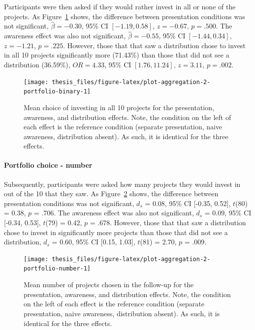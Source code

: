 \documentclass[a4paper, nobind, dvipsnames]{templates/ociamthesis}
\theoremstyle{definition}
\theoremstyle{definition}
\theoremstyle{definition}
\theoremstyle{definition}
\theoremstyle{remark}
\begin{document}
Participants were then asked if they would rather invest in all or none of the
projects. As Figure~\ref{fig:plot-aggregation-2-portfolio-binary} shows, the
difference between presentation conditions was not significant,
\(\hat{\beta} = -0.30\), 95\% CI \([-1.19, 0.58]\), \(z = -0.67\), \(p = .500\). The
awareness effect was also not significant,
\(\hat{\beta} = -0.55\), 95\% CI \([-1.44, 0.34]\), \(z = -1.21\), \(p = .225\). However,
those that that saw a distribution chose to invest in all 10 projects
significantly more
(71.43\%) than
those that did not see a distribution
(36.59\%),
\(OR = 4.33\), 95\% CI \([1.76, 11.24]\), \(z = 3.11\), \(p = .002\).



\begin{figure}
\texttt{[image: thesis\_files/figure-latex/plot-aggregation-2-portfolio-binary-1]} \caption{Mean choice of investing in all 10 projects for the presentation, awareness, and distribution effects. Note, the condition on the left of each effect is the reference condition (separate presentation, naive awareness, distribution absent). As such, it is identical for the three effects.}\label{fig:plot-aggregation-2-portfolio-binary}
\end{figure}

\paragraph{Portfolio choice - number}

Subsequently, participants were asked how many projects they would invest in out
of the 10 that they saw. As
Figure~\ref{fig:plot-aggregation-2-portfolio-number} shows, the difference
between presentation conditions was not significant,
\(d_s\) = 0.08, 95\% CI {[}-0.35, 0.52{]}, \(t\)(80) = 0.38, \(p\) = .706. The awareness effect
was also not significant, \(d_s\) = 0.09, 95\% CI {[}-0.34, 0.53{]}, \(t\)(79) = 0.42, \(p\) = .678.
However, those that that saw a distribution chose to invest in significantly
more projects than those that did not see a distribution,
\(d_s\) = 0.60, 95\% CI {[}0.15, 1.03{]}, \(t\)(81) = 2.70, \(p\) = .009.



\begin{figure}
\texttt{[image: thesis\_files/figure-latex/plot-aggregation-2-portfolio-number-1]} \caption{Mean number of projects chosen in the follow-up for the presentation, awareness, and distribution effects. Note, the condition on the left of each effect is the reference condition (separate presentation, naive awareness, distribution absent). As such, it is identical for the three effects.}\label{fig:plot-aggregation-2-portfolio-number}
\end{figure}
\end{document}
